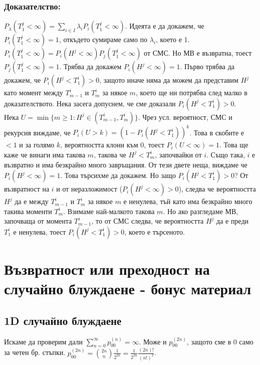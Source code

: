 \documentclass{article}
\begin{document}
\subsubsection*{Доказателство:}
$P_\lambda(T_1^j < \infty) = \sum_{i \in I} \lambda_i P_i(T_1^j < \infty)$. Идеята е да докажем, че $P_i(T_1^j < \infty) = 1$, откъдето сумираме 
само по $\lambda_i$, което е 1. \\ $P_i(T_1^j < \infty) = P_i(H^j < \infty)P_j(T_1^j < \infty)$ от СМС. Но МВ е възвратна, тоест $P_j(T_1^j < \infty) = 1$. 
Трябва да докажем $P_i(H^j < \infty) = 1$. Първо трябва да докажем, че $P_i(H^j < T_1^i) > 0$, защото иначе 
няма да можем да представим $H^j$ като момент между $T_{m-1}^i$ и $T_m^i$ за някое $m$, което ще ни потрябва 
след малко в доказателството. Нека засега допуснем, че сме доказали $P_i(H^j < T_1^i) > 0$. \\
Нека $U = \min\{m \geq 1 : H^j \in (T_{m-1}^i, T_m^i)\}$. Чрез усл. вероятност, СМС и рекурсия виждаме, че 
$P_i(U > k) = (1 - P_i(H^j < T_1^i))^k$. Това в скобите е $<1$ и за голямо $k$, вероятността клони към 0, тоест $P_i(U < \infty) = 1$. 
Това ще каже че винаги има такова $m$, такова че $H^j < T_m^i$, започвайки от $i$. Също така, $i$ е възвратно 
и има безкрайно много завръщания. От тези двете неща, виждаме че $P_i(H^j < \infty) = 1$. Това търсихме да докажем. 
Но защо $P_i(H^j < T_1^i) > 0$? От възвратност на $i$ и от неразложимост ($P_i(H^j < \infty) > 0$), следва че вероятността 
$H^j$ да е между $T_{m-1}^i$ и $T_m^i$ за някое $m$ е ненулева, тъй като има безкрайно много такива моменти $T_m^i$.  
Взимаме най-малкото такова $m$. Но ако разгледаме МВ, започваща от момента $T_{m-1}^i$, то от СМС следва, 
че вероятността $H^j$ да е преди $T_1^i$ е ненулева, тоест $P_i(H^j < T_1^i) > 0$, което е търсеното.

\section{Възвратност или преходност на случайно блуждаене - бонус материал}

\subsection{1D случайно блуждаене}
Искаме да проверим дали $\sum_{n=0}^\infty p_{00}^{(n)} = \infty$. Може и $p_{00}^{(2n)}$, защото сме 
в 0 само за четен бр. стъпки. $p_{00}^{(2n)} = \binom{2n}{n}\frac{1}{2^{2n}} = \frac{1}{2^{2n}}\frac{(2n)!}{(n!)^2}$. \\
\end{document}
